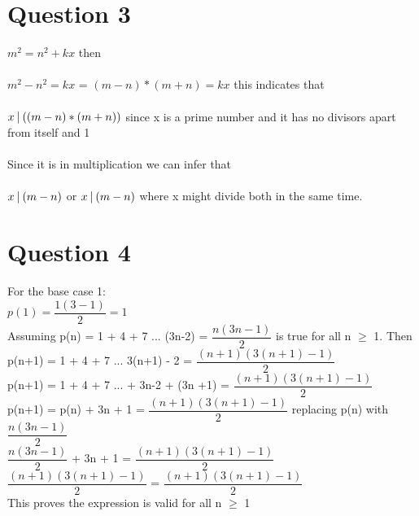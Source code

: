 \documentclass[12pt]{article}
\begin{document}
\section*{Question 3}

$m^2 = n^2 + kx$ then\\\\
$m^2 - n^2 = kx$ = $ (m-n) * (m+n) = kx$ this indicates that \\\\
$x\  \vline\ ((m-n) * (m+n))$ since x is a prime number and it has no divisors apart from itself and 1\\\\
Since it is in multiplication we can infer that\\\\
$ x\ \vline\ (m-n)$ or $x\ \vline\ (m-n)$ where x might divide both in the same time. 


\section*{Question 4}
For the base case 1: \\
$p(1) =\dfrac{1(3- 1)}{2} = 1$\\

Assuming p(n) = 1 + 4 + 7 ... (3n-2) = $\dfrac{n(3n-1)}{2}$ is true for all n $\geq$ 1. Then \\

p(n+1) = 1 + 4 + 7 ... 3(n+1) - 2  = $\dfrac{(n+1)(3(n+1) -1)}{2}$ \\

p(n+1) = 1 + 4 + 7 ... + 3n-2 + (3n +1)  = $\dfrac{(n+1)(3(n+1) -1)}{2}$ \\

p(n+1) = p(n) + 3n + 1 = $\dfrac{(n+1)(3(n+1) -1)}{2}$ replacing p(n) with $\dfrac{n(3n-1)}{2}$\\

$\dfrac{n(3n-1)}{2}$ + 3n + 1 =  $\dfrac{(n+1)(3(n+1) -1)}{2}$\\ 

$\dfrac{(n+1)(3(n+1) -1)}{2}$ = $\dfrac{(n+1)(3(n+1) -1)}{2}$\\

This proves the expression is valid for all n $\geq$ 1
\end{document}
